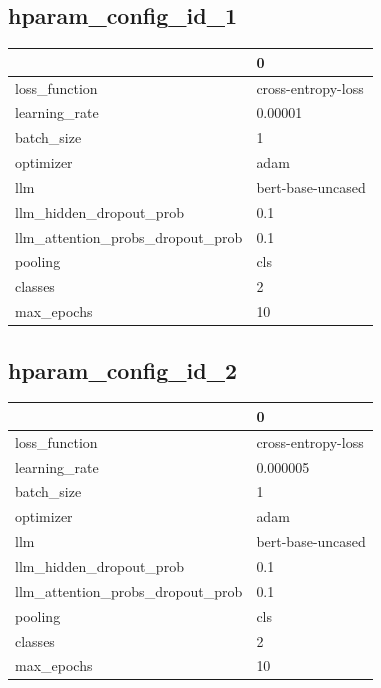 \documentclass{article}
\begin{document}
\subsection{hparam\_config\_id\_1}
\begin{tabular}{ll}
\toprule
{} &                   0 \\
\midrule
loss\_function                    &  cross-entropy-loss \\
learning\_rate                    &             0.00001 \\
batch\_size                       &                   1 \\
optimizer                        &                adam \\
llm                              &   bert-base-uncased \\
llm\_hidden\_dropout\_prob          &                 0.1 \\
llm\_attention\_probs\_dropout\_prob &                 0.1 \\
pooling                          &                 cls \\
classes                          &                   2 \\
max\_epochs                       &                  10 \\
\bottomrule
\end{tabular}

\subsection{hparam\_config\_id\_2}
\begin{tabular}{ll}
\toprule
{} &                   0 \\
\midrule
loss\_function                    &  cross-entropy-loss \\
learning\_rate                    &            0.000005 \\
batch\_size                       &                   1 \\
optimizer                        &                adam \\
llm                              &   bert-base-uncased \\
llm\_hidden\_dropout\_prob          &                 0.1 \\
llm\_attention\_probs\_dropout\_prob &                 0.1 \\
pooling                          &                 cls \\
classes                          &                   2 \\
max\_epochs                       &                  10 \\
\bottomrule
\end{tabular}
\end{document}
